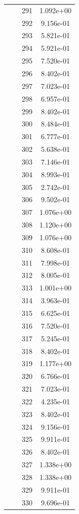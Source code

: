 \documentclass[12pt]{article}
\begin{document}
\begin{longtable}{@{}cccc@{}}
 &  & 291 & 1.092e+00 \\
 &  & 292 & 9.156e-01 \\
 &  & 293 & 5.821e-01 \\
 &  & 294 & 5.921e-01 \\
 &  & 295 & 7.520e-01 \\
 &  & 296 & 8.402e-01 \\
 &  & 297 & 7.023e-01 \\
 &  & 298 & 6.957e-01 \\
 &  & 299 & 8.402e-01 \\
 &  & 300 & 8.484e-01 \\
 &  & 301 & 6.777e-01 \\
 &  & 302 & 5.638e-01 \\
 &  & 303 & 7.146e-01 \\
 &  & 304 & 8.993e-01 \\
 &  & 305 & 2.742e-01 \\
 &  & 306 & 9.502e-01 \\
 &  & 307 & 1.076e+00 \\
 &  & 308 & 1.120e+00 \\
 &  & 309 & 1.076e+00 \\
 &  & 310 & 8.608e-01 \\
 &  & 311 & 7.998e-01 \\
 &  & 312 & 8.005e-01 \\
 &  & 313 & 1.001e+00 \\
 &  & 314 & 3.963e-01 \\
 &  & 315 & 6.625e-01 \\
 &  & 316 & 7.520e-01 \\
 &  & 317 & 5.245e-01 \\
 &  & 318 & 8.402e-01 \\
 &  & 319 & 1.177e+00 \\
 &  & 320 & 6.766e-01 \\
 &  & 321 & 7.023e-01 \\
 &  & 322 & 4.235e-01 \\
 &  & 323 & 8.402e-01 \\
 &  & 324 & 9.156e-01 \\
 &  & 325 & 9.911e-01 \\
 &  & 326 & 8.402e-01 \\
 &  & 327 & 1.338e+00 \\
 &  & 328 & 1.338e+00 \\
 &  & 329 & 9.911e-01 \\
 &  & 330 & 9.696e-01 \\

\end{longtable}
\end{document}

